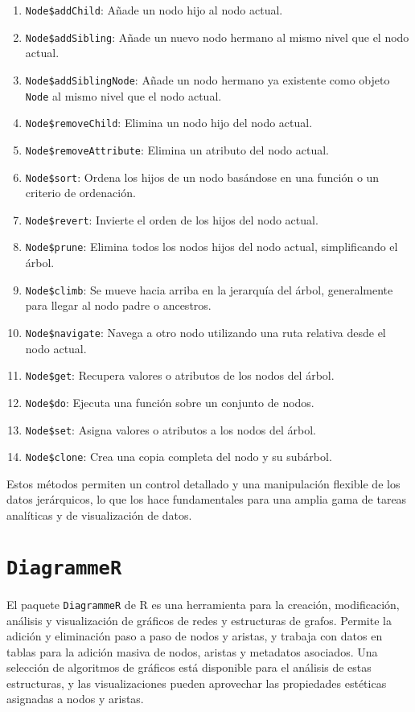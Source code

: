 \documentclass[12pt]{report}\usepackage[]{graphicx}\usepackage[dvipsnames]{xcolor}
\begin{document}
			 	\begin{enumerate}[label = \textbf{\arabic*.}]
			 		\item \texttt{Node\$addChild}: Añade un nodo hijo al nodo actual.
			 		\item \texttt{Node\$addSibling}: Añade un nuevo nodo hermano al mismo nivel que el nodo actual.
			 		\item \texttt{Node\$addSiblingNode}: Añade un nodo hermano ya existente como objeto \texttt{Node} al mismo nivel que el nodo actual.
			 		\item \texttt{Node\$removeChild}: Elimina un nodo hijo del nodo actual.
			 		\item \texttt{Node\$removeAttribute}: Elimina un atributo del nodo actual.
			 		\item \texttt{Node\$sort}: Ordena los hijos de un nodo basándose en una función o un criterio de ordenación.
			 		\item \texttt{Node\$revert}: Invierte el orden de los hijos del nodo actual.
			 		\item \texttt{Node\$prune}: Elimina todos los nodos hijos del nodo actual, simplificando el árbol.
			 		\item \texttt{Node\$climb}: Se mueve hacia arriba en la jerarquía del árbol, generalmente para llegar al nodo padre o ancestros.
			 		\item \texttt{Node\$navigate}: Navega a otro nodo utilizando una ruta relativa desde el nodo actual.
			 		\item \texttt{Node\$get}: Recupera valores o atributos de los nodos del árbol.
			 		\item \texttt{Node\$do}: Ejecuta una función sobre un conjunto de nodos.
			 		\item \texttt{Node\$set}: Asigna valores o atributos a los nodos del árbol.
			 		\item \texttt{Node\$clone}: Crea una copia completa del nodo y su subárbol.
			 	\end{enumerate}
			 	
			 	Estos métodos permiten un control detallado y una manipulación flexible de los datos jerárquicos, lo que los hace fundamentales para una amplia gama de tareas analíticas y de visualización de datos.
 	
 		\section{\texttt{DiagrammeR}}
 	
		 	El paquete \texttt{DiagrammeR} de R es una herramienta para la creación, modificación, análisis y visualización de gráficos de redes y estructuras de grafos. Permite la adición y eliminación paso a paso de nodos y aristas, y trabaja con datos en tablas para la adición masiva de nodos, aristas y metadatos asociados. Una selección de algoritmos de gráficos está disponible para el análisis de estas estructuras, y las visualizaciones pueden aprovechar las propiedades estéticas asignadas a nodos y aristas.\\
		 	
\end{document}

